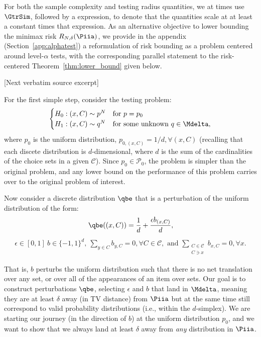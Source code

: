 \documentclass[10pt]{article}
\begin{document}
\begin{ReviewVerbatim}
	For both the sample complexity and testing radius quantities, we at times use $\GtrSim$, followed by a expression, to denote that the quantities scale at at least a constant times that expression. As an alternative objective to lower bounding the minimax risk $R_{N,\delta}(\Piia)$, we provide in the appendix (Section~\ref{app:alphatest}) a reformulation of risk bounding as a problem centered around level-$\alpha$ tests, with the corresponding parallel statement to the risk-centered Theorem~\ref{thm:lower_bound} given below.

[Next verbatim source excerpt]

	For the first simple step, consider the testing problem:
	\begin{align}
	\label{eq:test2}
	\begin{cases}
	H_0: (x, C) \sim p^N & \text{for } p = p_0 \\
	H_1: (x,C) \sim q^N & \text{for some unknown } q \in \Mdelta,
	\end{cases}
	\end{align}
	where $p_0$ is the uniform distribution, $p_{0,(x,C)} = 1/d, \forall (x,C)$ (recalling that each discete distribution is $d$-dimensional, where $d$ is the sum of the cardinalities of the choice sets in a given $\mathcal C$). Since $p_0 \in \mathcal{P}_0$, the problem is simpler than the original problem, and any lower bound on the performance of this problem carries over to the original problem of interest.

	Now consider a discrete distribution $\qbe$ that is a perturbation of the uniform distribution of the form:
	\begin{align*}
	\qbe((x,C)) = \frac{1}{d} + \frac{\epsilon b_{(x,C)}}{d},
	\end{align*}
	\begin{align*}
	\epsilon \in [0,1] \
	b \in \lbrace -1, 1 \rbrace^d,
	\
	\sum_{y \in C} b_{y,C} = 0, \forall C \in \mathcal C,
	\text{ and }
	\sum_{\substack{C \in \mathcal{C}\\ C \ni x}} b_{x,C} = 0, \forall x.
	\end{align*}

	That is, $b$ perturbs the uniform distribution such that there is no net translation over any set, or over all of the appearances of an item over sets. Our goal is to construct perturbations $\qbe$, selecting $\epsilon$ and $b$ that land in $\Mdelta$, meaning they are at least $\delta$ away (in TV distance) from $\Piia$ but at the same time still correspond to valid probability distributions (i.e., within the $d$-simplex). We are starting our journey (in the direction of $b$) at the uniform distribution $p_0$, and we want to show that we always land at least $\delta$ away from {\it any} distribution in $\Piia$.


\end{ReviewVerbatim}
\end{document}
